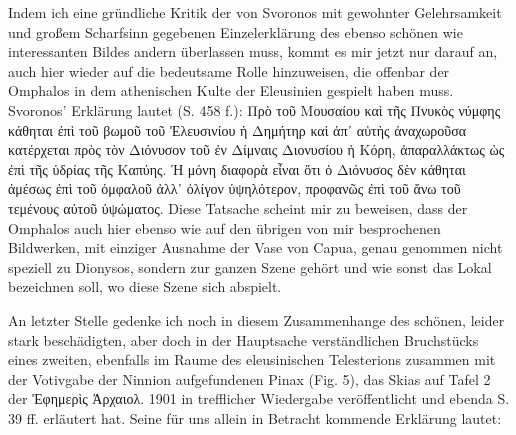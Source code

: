 \documentclass[a4paper, 11pt, oneside]{article}
\begin{document}
Indem ich eine gründliche Kritik der von Svoronos mit gewohnter Gelehrsamkeit und großem Scharfsinn gegebenen Einzelerklärung des ebenso schönen wie interessanten Bildes andern überlassen muss, kommt es mir jetzt nur darauf an, auch hier wieder auf die bedeutsame Rolle hinzuweisen, die offenbar der Omphalos in dem athenischen Kulte der Eleusinien gespielt haben muss. Svoronos' Erklärung lautet (S. 458 f.): Πρὸ τοῦ Μουσαίου καὶ τῆς Πνυκὸς νύμφης κάθηται ἐπὶ τοῦ βωμοῦ τοῦ Ἐλευσινίου ἡ Δημήτηρ καὶ ἀπ᾽ αὐτὴς ἀναχωροῦσα κατέρχεται πρὸς τὸν Διόνυσον τοῦ ἐν Δίμναις Διονυσίου ἡ Κόρη, ἀπαραλλάκτως ὡς ἐπὶ τῆς ὑδρίας τῆς Καπύης. Ἡ μόνη διαφορὰ εἶναι ὅτι ὁ Διόνυσος δὲν κάθηται ἀμέσως ἐπὶ τοῦ ὀμφαλοῦ ἀλλ᾽ ὀλίγον ὑψηλότερον, προφανῶς ἐπὶ τοῦ ἄνω τοῦ τεμένους αὐτοῦ ὑψώματος. Diese Tatsache scheint mir zu beweisen, dass der Omphalos auch hier ebenso wie auf den übrigen von mir besprochenen Bildwerken, mit einziger Ausnahme der Vase von Capua, genau genommen nicht speziell zu Dionysos, sondern zur ganzen Szene gehört und wie sonst das Lokal bezeichnen soll, wo diese Szene sich abspielt.

An letzter Stelle gedenke ich noch in diesem Zusammenhange des schönen, leider stark beschädigten, aber doch in der Hauptsache verständlichen Bruchstücks eines zweiten, ebenfalls im Raume des eleusinischen Telesterions zusammen mit der Votivgabe der Ninnion aufgefundenen Pinax (Fig. 5), das Skias auf Tafel 2 der Ἐφημερὶς Ἀρχαιολ. 1901 in trefflicher Wiedergabe veröffentlicht und ebenda S. 39 ff. erläutert hat. Seine für uns allein in Betracht kommende Erklärung lautet:
\end{document}
